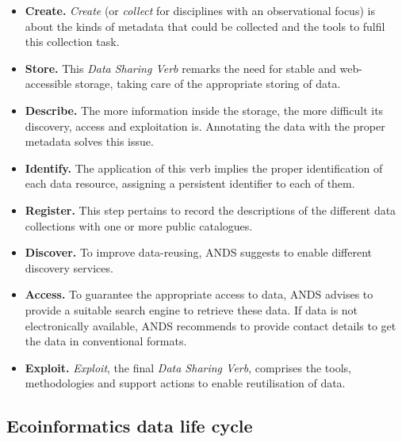 \begin{itemize}
    \item \textbf{Create.} \textit{Create} (or \textit{collect} for disciplines with an observational focus) is about the kinds of metadata that could be collected and the tools to fulfil this collection task.
    \item \textbf{Store.} This \textit{Data Sharing Verb} remarks the need for stable and web-accessible storage, taking care of the appropriate storing of data.
    \item \textbf{Describe.} The more information inside the storage, the more difficult its discovery, access and exploitation is. Annotating the data with the proper metadata solves this issue.
    \item \textbf{Identify.} The application of this verb implies the proper identification of each data resource, assigning a persistent identifier to each of them.
    \item \textbf{Register.} This step pertains to record the descriptions of the different data collections with one or more public catalogues.
    \item \textbf{Discover.} To improve data-reusing, ANDS suggests to enable different discovery services.
    \item \textbf{Access.} To guarantee the appropriate access to data, ANDS advises to provide a suitable search engine to retrieve these data. If data is not electronically available, ANDS recommends to provide contact details to get the data in conventional formats.
    \item \textbf{Exploit.} \textit{Exploit}, the final \textit{Data Sharing Verb}, comprises the tools, methodologies and support actions to enable reutilisation of data.
\end{itemize}

\subsection{Ecoinformatics data life cycle}

